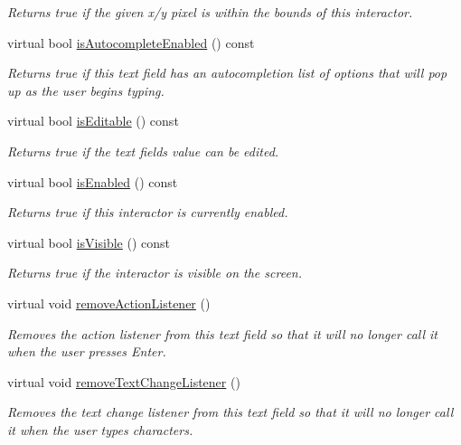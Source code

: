 \begin{DoxyCompactItemize}
\begin{DoxyCompactList}\small\item\em Returns true if the given x/y pixel is within the bounds of this interactor. \end{DoxyCompactList}\item 
virtual bool \mbox{\hyperlink{classGTextField_a7528cfb0542ac5268efe1d7362b89344}{is\+Autocomplete\+Enabled}} () const
\begin{DoxyCompactList}\small\item\em Returns true if this text field has an autocompletion list of options that will pop up as the user begins typing. \end{DoxyCompactList}\item 
virtual bool \mbox{\hyperlink{classGTextField_a012b5afb54e037e6c5498cf0932a521b}{is\+Editable}} () const
\begin{DoxyCompactList}\small\item\em Returns true if the text field\textquotesingle{}s value can be edited. \end{DoxyCompactList}\item 
virtual bool \mbox{\hyperlink{classGInteractor_aacb819fb241851fd9fc045271baa4034}{is\+Enabled}} () const
\begin{DoxyCompactList}\small\item\em Returns true if this interactor is currently enabled. \end{DoxyCompactList}\item 
virtual bool \mbox{\hyperlink{classGInteractor_a9d8a6cfb13917785c143e74d40e4e2be}{is\+Visible}} () const
\begin{DoxyCompactList}\small\item\em Returns true if the interactor is visible on the screen. \end{DoxyCompactList}\item 
virtual void \mbox{\hyperlink{classGTextField_ab7fe7a876367b87cf7202f947f1d05e4}{remove\+Action\+Listener}} ()
\begin{DoxyCompactList}\small\item\em Removes the action listener from this text field so that it will no longer call it when the user presses Enter. \end{DoxyCompactList}\item 
virtual void \mbox{\hyperlink{classGTextField_a69c940b99d01eb7c353763ce4b0942a4}{remove\+Text\+Change\+Listener}} ()
\begin{DoxyCompactList}\small\item\em Removes the text change listener from this text field so that it will no longer call it when the user types characters. \end{DoxyCompactList}\item 

\end{DoxyCompactItemize}

